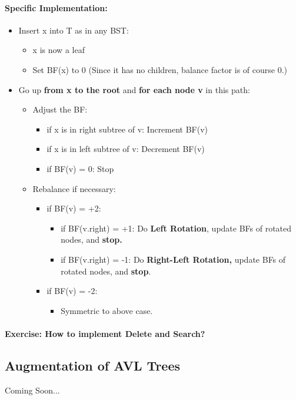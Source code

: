 \documentclass{article}
\begin{document}
\paragraph{Specific Implementation: }
\begin{itemize}
\item Insert x into T as in any BST:
\begin{itemize}
\item x is now a leaf
\item Set BF(x) to 0 (Since it has no children, balance factor is of course 0.)
\end{itemize}
\item Go up \textbf{from x to the root} and \textbf{for each node v} in this path: 
\begin{itemize}
\item Adjust the BF:
\begin{itemize}b
\item 
if x is in right subtree of v: Increment BF(v)
\item
if x is in left subtree of v: Decrement BF(v)
\item if BF(v) = 0: Stop
\end{itemize}
\item Rebalance if necessary:
\begin{itemize}
\item 
if BF(v) = +2:
\begin{itemize}
\item 
if BF(v.right) = +1: Do \textbf{Left Rotation}, update BFs of rotated nodes, and \textbf{stop.}
\item 
if BF(v.right) = -1: Do \textbf{Right-Left Rotation, }update BFs of rotated nodes, and \textbf{stop}.
\end{itemize}
\item if BF(v) = -2:
\begin{itemize}
\item 
Symmetric to above case.
\end{itemize}
\end{itemize}
\end{itemize}
\end{itemize}
\paragraph{Exercise: How to implement Delete and Search?}
\subsection{Augmentation of AVL Trees}
Coming Soon...
\end{document}
